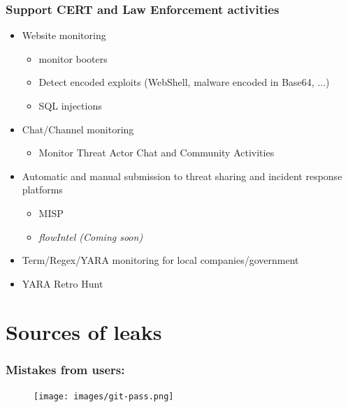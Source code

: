 \documentclass[aspectratio=169]{beamer}
\begin{document}
\begin{frame}
    \frametitle{Support CERT and Law Enforcement activities}
    	\begin{itemize}
		    \item Website monitoring
		    	\begin{itemize}
				    \item monitor booters
				    \item Detect encoded exploits (WebShell, malware encoded in Base64, ...)
				    \item SQL injections
		    	\end{itemize}
		    \item Chat/Channel monitoring
		        \begin{itemize}
				    \item Monitor Threat Actor Chat and Community Activities
		        \end{itemize}
		    \item Automatic and manual submission to threat sharing and incident response platforms
			    \begin{itemize}
				    \item MISP
				    \item \textit{flowIntel (Coming soon)}
			    \end{itemize}
		    \item Term/Regex/YARA monitoring for local companies/government
		    \item YARA Retro Hunt
        \end{itemize}
\end{frame}

\section{Sources of leaks}

\begin{frame}
    \frametitle{Mistakes from users:}
        \begin{figure}
            \texttt{[image: images/git-pass.png]}
        \end{figure}
\end{frame}
\end{document}
